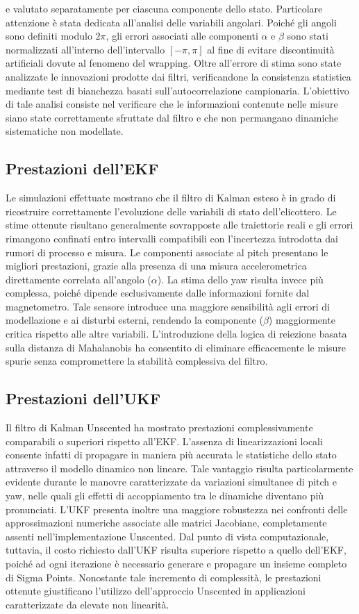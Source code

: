 \documentclass[12pt,a4paper]{article}
\begin{document}
e valutato separatamente per ciascuna componente dello stato.
Particolare attenzione è stata dedicata all'analisi delle variabili angolari. 
Poiché gli angoli sono definiti modulo $2\pi$, gli errori associati alle componenti 
$\alpha$ e $\beta$ sono stati normalizzati all'interno dell'intervallo $[-\pi,\pi]$ 
al fine di evitare discontinuità artificiali dovute al fenomeno del wrapping.
Oltre all'errore di stima sono state analizzate le innovazioni prodotte dai filtri, 
verificandone la consistenza statistica mediante test di bianchezza basati sull'autocorrelazione
campionaria.
L'obiettivo di tale analisi consiste nel verificare che le informazioni contenute
nelle misure siano state correttamente sfruttate dal filtro e che non permangano dinamiche
sistematiche non modellate.


\subsection{Prestazioni dell'EKF}
Le simulazioni effettuate mostrano che il filtro di Kalman esteso è in grado di ricostruire correttamente l'evoluzione delle variabili di stato dell'elicottero.
Le stime ottenute risultano generalmente sovrapposte alle traiettorie reali e gli errori rimangono confinati entro intervalli compatibili con l'incertezza introdotta dai rumori di processo e misura.
Le componenti associate al pitch presentano le migliori prestazioni, grazie alla presenza di una misura accelerometrica direttamente correlata all'angolo ($\alpha$).
La stima dello yaw risulta invece più complessa, poiché dipende esclusivamente dalle informazioni fornite dal magnetometro. Tale sensore introduce una maggiore sensibilità agli errori di modellazione e ai disturbi esterni, rendendo la componente ($\beta$) maggiormente critica rispetto alle altre variabili.
L'introduzione della logica di reiezione basata sulla distanza di Mahalanobis ha consentito di eliminare efficacemente le misure spurie senza compromettere la stabilità complessiva del filtro.

\subsection{Prestazioni dell'UKF}
Il filtro di Kalman Unscented ha mostrato prestazioni complessivamente comparabili o superiori rispetto all'EKF.
L'assenza di linearizzazioni locali consente infatti di propagare in maniera più accurata le statistiche dello stato attraverso il modello dinamico non lineare.
Tale vantaggio risulta particolarmente evidente durante le manovre caratterizzate da variazioni simultanee di pitch e yaw, nelle quali gli effetti di accoppiamento tra le dinamiche diventano più pronunciati.
L'UKF presenta inoltre una maggiore robustezza nei confronti delle approssimazioni numeriche associate alle matrici Jacobiane, completamente assenti nell'implementazione Unscented.
Dal punto di vista computazionale, tuttavia, il costo richiesto dall'UKF risulta superiore rispetto a quello dell'EKF, poiché ad ogni iterazione è necessario generare e propagare un insieme completo di Sigma Points.
Nonostante tale incremento di complessità, le prestazioni ottenute giustificano l'utilizzo dell'approccio Unscented in applicazioni caratterizzate da elevate non linearità.
\end{document}
